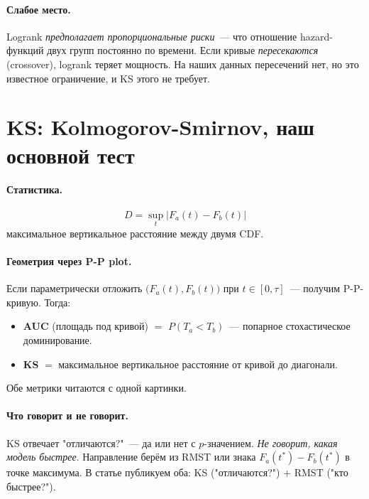 \documentclass[11pt]{article}
\begin{document}
\paragraph{Слабое место.} Logrank \emph{предполагает пропорциональные риски}~--- что отношение hazard-функций двух групп постоянно по времени. Если кривые \emph{пересекаются} (crossover), logrank теряет мощность. На наших данных пересечений нет, но это известное ограничение, и KS этого не требует.

\section{KS: Kolmogorov-Smirnov, наш основной тест}\label{sec:ks}

\paragraph{Статистика.}
\[
D = \sup_t \big|F_a(t) - F_b(t)\big|
\]
максимальное вертикальное расстояние между двумя CDF.

\paragraph{Геометрия через P-P plot.} Если параметрически отложить $\big(F_a(t), F_b(t)\big)$ при $t \in [0, \tau]$~--- получим P-P-кривую. Тогда:
\begin{itemize}[leftmargin=2em, itemsep=1pt]
\item \textbf{AUC} (площадь под кривой) $=$ $P(T_a < T_b)$~--- попарное стохастическое доминирование.
\item \textbf{KS} $=$ максимальное вертикальное расстояние от кривой до диагонали.
\end{itemize}
Обе метрики читаются с одной картинки.

\paragraph{Что говорит и не говорит.} KS отвечает "отличаются?"~--- да или нет с $p$-значением. \emph{Не говорит, какая модель быстрее}. Направление берём из RMST или знака $F_a(t^*) - F_b(t^*)$ в точке максимума. В статье публикуем оба: KS ("отличаются?") $+$ RMST ("кто быстрее?").
\end{document}

